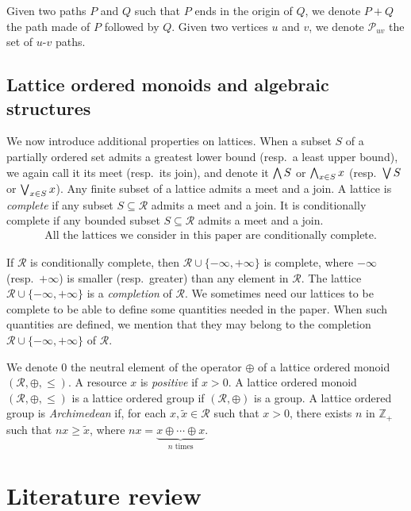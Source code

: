 \documentclass[11pt]{amsart}
\theoremstyle{plain}
\theoremstyle{remark}
\def\Z{\mathbb{Z}}
\newcommand{\rplus}{\oplus}
\newcommand{\rleq}{\leqslant}
\newcommand{\rgeq}{\geqslant}
\newcommand{\rset}{\mathcal{R}}
\newcommand{\re}{x}
\begin{document}
Given two paths $P$ and $Q$ such that $P$ ends in the origin of $Q$, we denote $P+Q$ the path made of $P$ followed by $Q$. Given two vertices $u$ and $v$, we denote $\mathcal{P}_{uv}$ the set of $u$-$v$ paths.

\subsection{Lattice ordered monoids and algebraic structures} \label{sub:lattice_ordered_monoids_and_algebraic_structures}

We now introduce additional properties on lattices. When a subset $S$ of a partially ordered set admits a greatest lower bound (resp.~a least upper bound), we again call it its meet (resp.~its join), and denote it $\bigwedge S$ or $\bigmeet_{\re \in S}\re$ (resp.~$\bigvee S$ or $\bigjoin_{\re\in S}\re$). Any finite subset of a lattice admits a meet and a join. A lattice is \emph{complete} if any subset $S\subseteq \rset$ admits a meet and a join. It is conditionally complete if any bounded subset $S \subseteq \rset$ admits a meet and a join. 
\begin{align}\label{eq:latticesConditionnallyComplete}
& \text{All the lattices we consider in this paper are conditionally complete.} 
\end{align}

If $\rset$ is conditionally complete, then $\rset\cup\{-\infty,+\infty\}$ is complete, where $-\infty$ (resp.~$+\infty$) is smaller (resp.~greater) than any element in $\rset$. The lattice $\rset\cup\{-\infty,+\infty\}$ is a \emph{completion} of $\rset$. 
We sometimes need our lattices to be complete to be able to define some quantities needed in the paper. When such quantities are defined, we mention that they may belong to the completion $\rset\cup\{-\infty,+\infty\}$ of $\rset$.

We denote $0$ the neutral element of the operator $\rplus$ of a lattice ordered monoid $(\rset,\rplus,\rleq)$. A resource $\re$ is \emph{positive} if $\re>0$. A lattice ordered monoid $(\rset,\rplus,\rleq)$ is a lattice ordered group if $(\rset,\rplus)$ is a group. A lattice ordered group is \emph{Archimedean} if, for each $\re,\tilde{\re} \in \rset$ such that $\re>0$, there exists $n$ in $\Z_{+}$ such that $n\re \rgeq \tilde{\re}$, where $n\re = \underbrace{\re\rplus\cdots\rplus\re}_{n\text{ times}}$.


\section{Literature review} \label{sec:literature_review}
\end{document}
